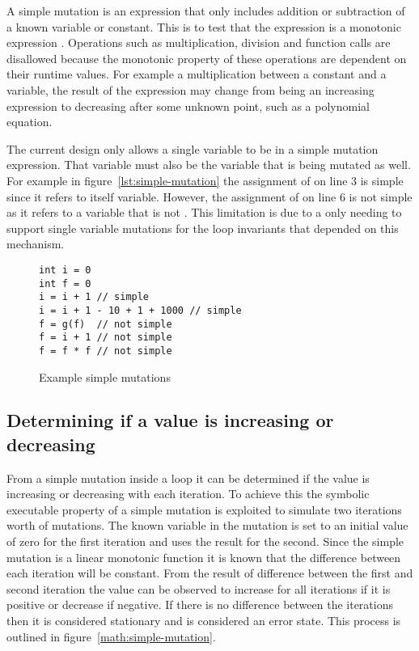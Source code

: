 A simple mutation is an expression that only includes addition or subtraction
of a known variable or constant.
This is to test that the expression is a monotonic expression \cite{tanton2005encyclopedia}.
Operations such as multiplication, division and function calls are disallowed
because the monotonic property of these operations are dependent on their
runtime values.
For example a multiplication between a constant and a variable,
the result of the expression may change from being an increasing expression
to decreasing after some unknown point, such as a polynomial equation.

The current design only allows a single variable to be in a simple mutation
expression.
That variable must also be the variable that is being mutated as well.
For example in figure~\ref{lst:simple-mutation} the assignment of  on
line 3 is simple since it refers to itself variable.
However, the assignment of  on line 6 is not simple as
it refers to a variable that is not .
This limitation is due to a only needing to 
support single variable mutations for the loop invariants
that depended on this mechanism.

\begin{figure}[ht]
\begin{lstlisting}
int i = 0
int f = 0
i = i + 1 // simple
i = i + 1 - 10 + 1 + 1000 // simple
f = g(f)  // not simple
f = i + 1 // not simple
f = f * f // not simple
\end{lstlisting}
\caption{Example simple mutations}
\label{lst:simple-mutations}
\end{figure}

\subsection{Determining if a value is increasing or decreasing}\label{s:sequence-dir}


From a simple mutation inside a loop it can be determined if the value is
increasing or decreasing with each iteration.
To achieve this the symbolic executable property of a simple mutation is
exploited to simulate two iterations worth of mutations.
The known variable in the mutation is set to an initial value of zero for
the first iteration and uses the result for the second.
Since the simple mutation is a linear monotonic function it is known that
the difference between each iteration will be constant.
From the result of difference between the first and second iteration the
value can be observed to increase for all iterations if it is positive or
decrease if negative. If there is no difference between the iterations then
it is considered stationary and is considered an error state.
This process is outlined in figure~\ref{math:simple-mutation}.

